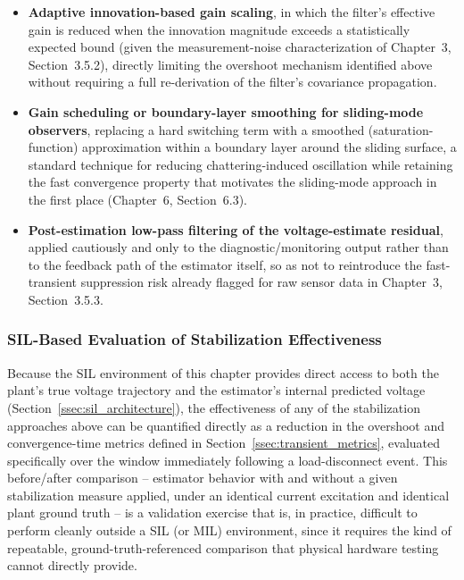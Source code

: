 \begin{itemize}
	\item \textbf{Adaptive innovation-based gain scaling}, in which the filter's effective gain is reduced when the innovation magnitude exceeds a statistically expected bound (given the measurement-noise characterization of Chapter~3, Section~3.5.2), directly limiting the overshoot mechanism identified above without requiring a full re-derivation of the filter's covariance propagation.
	\item \textbf{Gain scheduling or boundary-layer smoothing for sliding-mode observers}, replacing a hard switching term with a smoothed (saturation-function) approximation within a boundary layer around the sliding surface, a standard technique for reducing chattering-induced oscillation while retaining the fast convergence property that motivates the sliding-mode approach in the first place (Chapter~6, Section~6.3).
	\item \textbf{Post-estimation low-pass filtering of the voltage-estimate residual}, applied cautiously and only to the diagnostic/monitoring output rather than to the feedback path of the estimator itself, so as not to reintroduce the fast-transient suppression risk already flagged for raw sensor data in Chapter~3, Section~3.5.3.
\end{itemize}

\subsubsection{SIL-Based Evaluation of Stabilization Effectiveness}

Because the SIL environment of this chapter provides direct access to both the plant's true voltage trajectory and the estimator's internal predicted voltage (Section~\ref{ssec:sil_architecture}), the effectiveness of any of the stabilization approaches above can be quantified directly as a reduction in the overshoot and convergence-time metrics defined in Section~\ref{ssec:transient_metrics}, evaluated specifically over the window immediately following a load-disconnect event. This before/after comparison -- estimator behavior with and without a given stabilization measure applied, under an identical current excitation and identical plant ground truth -- is a validation exercise that is, in practice, difficult to perform cleanly outside a SIL (or MIL) environment, since it requires the kind of repeatable, ground-truth-referenced comparison that physical hardware testing cannot directly provide.

